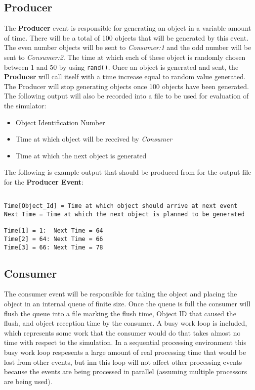 \subsection{Producer}
The {\bf Producer} event is responsible for generating an object in a
variable amount of time.  There will be a total of 100 objects
that will be generated by this event.  The even number objects will 
be sent to {\em Consumer:1} and the odd number will be sent to 
{\em Consumer:2}.
The time at which each of these object is randomly chosen between 1 and
50 by using {\tt rand()}.
Once an object is generated and sent, the {\bf Producer}
will call itself with a time increase equal to random value
generated.  The Producer will stop generating objects once 100
objects have been generated.  The following output will also be
recorded into a file to be used for evaluation of the simulator:
\begin{itemize}
\item Object Identification Number
\item Time at which object will be received by {\em Consumer}
\item Time at which the next object is generated
\end{itemize}
The following is example output that should be produced from \dispare
for the output file for the {\bf Producer Event}:
\begin{verbatim}

Time[Object_Id] = Time at which object should arrive at next event
Next Time = Time at which the next object is planned to be generated

Time[1] = 1:  Next Time = 64
Time[2] = 64: Next Time = 66
Time[3] = 66: Next Time = 78
\end{verbatim}


\subsection{Consumer}
The consumer event will be responsible for taking the object and placing
the object in an internal queue of finite size.  Once the queue is full
the consumer will flush the queue into a file marking the flush time,
Object ID that caused the flush, and object reception time by the
consumer. A busy work loop is included, which represents some work that
the consumer would do that takes almost no time with respect to the
simulation.  In a sequential processing environment this busy work loop
respesents a large amount of real processing time that would be lost
from other events, but inn \dispare this loop will not affect other
processing events because the events are being processed in parallel
(assuming multiple processors are being used).
 
